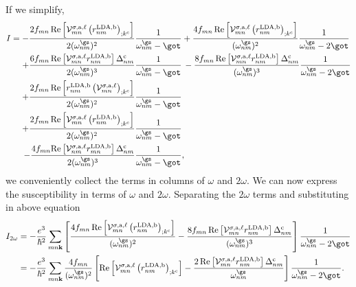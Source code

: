 If we simplify,
\begin{align}\label{simplified_i} 
I =
-   \frac{2f_{mn}\,\mathrm{Re}\left[\mathcal{V}^{\sigma,\text{a},\ell}_{mn}
    \left(r^{\text{LDA,b}}_{nm}\right)_{;k^{\text{c}}}\right]}
    {2(\omega^{\gs}_{nm})^{2}}&\frac{1}{\omega^{\gs}_{nm}-\got}
+   \frac{4f_{mn}\,\mathrm{Re}\left[\mathcal{V}^{\sigma,\text{a},\ell}_{mn}
    \left(r^{\text{LDA,b}}_{nm}\right)_{;k^{\text{c}}}\right]}
    {(\omega^{\gs}_{nm})^{2}}\frac{1}{\omega^{\gs}_{nm}-2\got}\nonumber\\
+   \frac{6f_{mn}\,\mathrm{Re}\left[\mathcal{V}^{\sigma,\text{a},\ell}_{mn}
    r^{\text{LDA,b}}_{nm}\right]
    \Delta^{\text{c}}_{nm}}{2(\omega^{\gs}_{nm})^{3}}
    &\frac{1}{\omega^{\gs}_{nm}-\got} 
\,- \frac{8f_{mn}\,\mathrm{Re}\left[\mathcal{V}^{\sigma,\text{a},\ell}_{mn}
    r^{\text{LDA,b}}_{nm}\right]\Delta^{\text{c}}_{nm}}{(\omega^{\gs}_{nm})^{3}}
    \frac{1}{\omega^{\gs}_{nm}-2\got}\nonumber\\
+   \frac{2f_{mn}\,\mathrm{Re}\left[r^{\text{LDA,b}}_{nm}
    \left(\mathcal{V}^{\sigma,\text{a},\ell}_{mn}\right)
    _{;k^{\text{c}}}\right]}{2(\omega^{\gs}_{nm})^{2}}
    &\frac{1}{\omega^{\gs}_{nm}-\got}\nonumber\\
+   \frac{2f_{mn}\,\mathrm{Re}\left[\mathcal{V}^{\sigma,\text{a},\ell}_{mn}
    \left(r^{\text{LDA,b}}_{nm}\right)_{;k^{\text{c}}}\right]}
    {2(\omega^{\gs}_{nm})^{2}}&\frac{1}{\omega^{\gs}_{nm}-\got}\nonumber\\
-   \frac{4f_{mn}\mathrm{Re}\left[\mathcal{V}^{\sigma,\text{a},\ell}_{nm}
    r^{\text{LDA,b}}_{mn}\right]\Delta_{nm}^{\text{c}}}{2(\omega^{\gs}_{nm})^{3}}
    &\frac{1}{\omega^{\gs}_{nm}-\got}
,
\end{align}
we conveniently collect the terms in columns of $\omega$ and $2\omega$. 
We can now express the susceptibility in terms of $\omega$ and $2\omega$. 
Separating the $2\omega$ terms and substituting in above equation
\begin{align}\label{2wchii}
I_{2\omega}
&=  -\frac{e^{3}}{\hbar^2}\sum_{mn\mathbf{k}}\left[\frac{4f_{mn}\,\mathrm{Re}
    \left[\mathcal{V}^{\sigma,\text{a},\ell}_{mn}
    \left(r^{\text{LDA,b}}_{nm}\right)_{;k^{\text{c}}}\right]}
    {(\omega^{\gs}_{nm})^{2}} - \frac{8f_{mn}\,\mathrm{Re}
    \left[\mathcal{V}^{\sigma,\text{a},\ell}_{mn}r^{\text{LDA,b}}_{nm}\right]
    \Delta^{\text{c}}_{nm}}{(\omega^{\gs}_{nm})^{3}}\right]
    \frac{1}{\omega^{\gs}_{nm}-2\got}\nonumber\\
&=  -\frac{e^3}{\hbar^2}\sum_{mn\mathbf{k}}
    \frac{4f_{mn}}{(\omega^{\gs}_{nm})^{2}}
    \left[\mathrm{Re}\left[\mathcal{V}^{\sigma,\text{a},\ell}_{mn}
    \left(r^{\text{LDA,b}}_{nm}\right)_{;k^{\text{c}}}\right] 
-   \frac{2\,\mathrm{Re}\left[\mathcal{V}^{\sigma,\text{a},\ell}_{mn}
    r^{\text{LDA,b}}_{nm}\right]\Delta^{\text{c}}_{nm}}{\omega^{\gs}_{nm}}\right]
    \frac{1}{\omega^{\gs}_{nm}-2\got}
.
\end{align}

